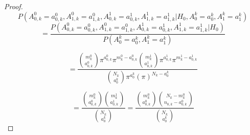 \documentclass[12pt,oneside]{report}
\theoremstyle{definition}
\theoremstyle{mystyle}
\begin{document}
\begin{proof}
	
	\begin{equation*}
	P(A_{0,k}^{0}=a_{0,k}^{0},A_{1,k}^{0}=a_{1,k}^{0},A_{0,k}^{1}=a_{0,k}^{1},A_{1,k}^{1}=a_{1,k}^{1}|H_{0},A_{0}^{k}=a_{0}^{k},A_{1}^{k}=a_{1}^{k})
	\end{equation*}
%
\begin{equation*}
=\frac{P(A_{0,k}^{0}=a_{0,k}^{0},A_{1,k}^{0}=a_{1,k}^{0},A_{0,k}^{1}=a_{0,k}^{1},A_{1,k}^{1}=a_{1,k}^{1}|H_{0})}{P(A_{0}^{k}=a_{0}^{k},A_{1}^{k}=a_{1}^{k})} 
\end{equation*}	
	
	
	
\begin{equation*}
=\frac{\displaystyle \binom{m_{k}^{0}}{a_{0,k}^{0}}\pi^{a_{0,k}^{0}}\pi^{m_{k}^{0}-a_{0,k}^{0}}\displaystyle \binom{m_{k}^{1}}{a_{0,k}^{1}}\pi^{a_{0,k}^{1}}\pi^{m_{k}^{1}-a_{0,k}^{1}}}{\displaystyle \binom{N_{k}}{a_{0}^{k}}\pi^{a_{0}^{k}}(\pi)^{N_{k}-a_{0}^{k}}}
\end{equation*}	



\begin{equation*}
=\frac{\displaystyle\binom{m_{k}^{0}}{a_{0,k}^{0}}\displaystyle\binom{m_{k}^{1}}{a_{0,k}^{1}}}{\displaystyle\binom{N_{k}}{a_{0}^{k}}}=\frac{\displaystyle\binom{m_{k}^{0}}{a_{0,k}^{0}}\displaystyle\binom{N_{k}-m_{k}^{0}}{n_{0,k}-a^{0}_{0,k}}}{\displaystyle\binom{N_{k}}{a_{0}^{k}}}
\end{equation*}		
	\vspace{6mm}
	
	


\end{proof}
\end{document}
